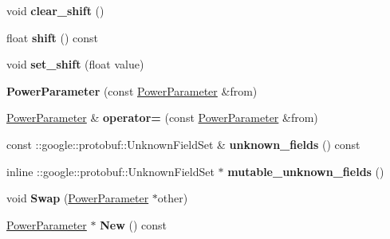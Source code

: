 \begin{DoxyCompactItemize}
void {\bfseries clear\+\_\+shift} ()
\item 
\mbox{\label{classcaffe_1_1_power_parameter_a7265e37be33178589e7257722d4022af}} 
float {\bfseries shift} () const
\item 
\mbox{\label{classcaffe_1_1_power_parameter_a7ed056f57b1fedb7174f069ab39727f2}} 
void {\bfseries set\+\_\+shift} (float value)
\item 
\mbox{\label{classcaffe_1_1_power_parameter_acc59856938e69855450548878cd5da4a}} 
{\bfseries Power\+Parameter} (const \mbox{\hyperlink{classcaffe_1_1_power_parameter}{Power\+Parameter}} \&from)
\item 
\mbox{\label{classcaffe_1_1_power_parameter_a358b457de880d96dc719f43f783d4f56}} 
\mbox{\hyperlink{classcaffe_1_1_power_parameter}{Power\+Parameter}} \& {\bfseries operator=} (const \mbox{\hyperlink{classcaffe_1_1_power_parameter}{Power\+Parameter}} \&from)
\item 
\mbox{\label{classcaffe_1_1_power_parameter_a00b3cee3a407ca7b4671beb9a31ac9bc}} 
const \+::google\+::protobuf\+::\+Unknown\+Field\+Set \& {\bfseries unknown\+\_\+fields} () const
\item 
\mbox{\label{classcaffe_1_1_power_parameter_a18539a26214c836c5696acdd86d7e6ef}} 
inline \+::google\+::protobuf\+::\+Unknown\+Field\+Set $\ast$ {\bfseries mutable\+\_\+unknown\+\_\+fields} ()
\item 
\mbox{\label{classcaffe_1_1_power_parameter_a57fa5991ae8d7b4f1ce869f9a5d9f8ab}} 
void {\bfseries Swap} (\mbox{\hyperlink{classcaffe_1_1_power_parameter}{Power\+Parameter}} $\ast$other)
\item 
\mbox{\label{classcaffe_1_1_power_parameter_a1a3245abb203e68dfc0faa3ab2a6a43a}} 
\mbox{\hyperlink{classcaffe_1_1_power_parameter}{Power\+Parameter}} $\ast$ {\bfseries New} () const
\item 
\mbox{\label{classcaffe_1_1_power_parameter_a590b0b037681e68d83186271270b9a53}} 

\end{DoxyCompactItemize}
